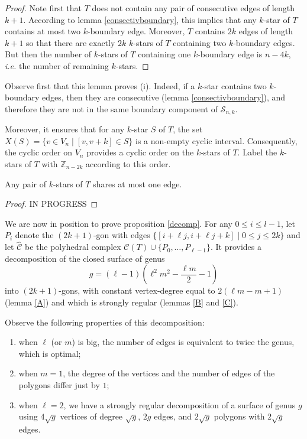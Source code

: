 \documentclass[12pt]{amsart}
\begin{document}
\begin{proof}
Note first that $T$ does not contain any pair of consecutive edges of length $k+1$. According to lemma \ref{consectivboundary}, this implies that any $k$-star of $T$ contains at most two $k$-boundary edge. Moreover, $T$ contains $2k$ edges of length $k+1$ so that there are exactly $2k$ $k$-stars of $T$ containing two $k$-boundary edges. But then the number of $k$-stars of $T$ containing one $k$-boundary edge is $n-4k$, {\it i.e.} the number of remaining $k$-stars.
\end{proof}

Observe first that this lemma proves (i). Indeed, if a $k$-star contains two $k$-boundary edges, then they are consecutive (lemma \ref{consectivboundary}), and therefore they are not in the same boundary component of $\mathcal{S}_{n,k}$.

Moreover, it ensures that for any $k$-star $S$ of $T$, the set $X(S)=\{v\in V_n\;|\; [v,v+k]\in S\}$ is a non-empty cyclic interval. Consequently, the cyclic order on $V_n$ provides a cyclic order on the $k$-stars of $T$. Label the $k$-stars of $T$ with $\mathbb{Z}_{n-2k}$ according to this order. 


\begin{lemma}\label{C}
Any pair of $k$-stars of $T$ shares at most one edge. 
\end{lemma}

\begin{proof}
IN PROGRESS
\end{proof}

We are now in position to prove proposition \ref{decomp}. 
For any $0\le i\le l-1$, let $P_i$ denote the $(2k+1)$-gon with edges $\{[i+\ell j,i+\ell j+k]\;|\; 0\le j\le 2k\}$ and let $\hat{\mathcal{C}}$ be the polyhedral complex $\mathcal{C}(T)\cup\{P_0,\ldots,P_{\ell-1}\}$. It provides a decomposition of the closed surface of genus 
$$g=(\ell-1)(\ell^2m^2-\frac{\ell m}{2}-1)$$
into $(2k+1)$-gons, with constant vertex-degree equal to $2(\ell m-m+1)$ (lemma \ref{A}) and which is strongly regular (lemmas \ref{B} and \ref{C}).

Observe the following properties of this decomposition:
\begin{enumerate}
\item when $\ell$ (or $m$) is big, the number of edges is equivalent to twice the genus, which is optimal;
\item when $m=1$, the degree of the vertices and the number of edges of the polygons differ just by $1$;
\item when $\ell=2$, we have a strongly regular decomposition of a surface of genus $g$ using $4\sqrt{g}$ vertices of degree $\sqrt{g}$, $2g$ edges, and $2\sqrt{g}$ polygons with $2\sqrt{g}$ edges.
\end{enumerate}
\end{document}
